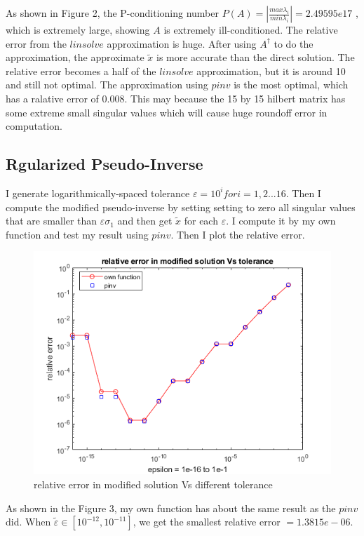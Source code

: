 \documentclass[a4paper]{article}
\begin{document}
As shown in Figure 2, the P-conditioning number $P(A)=|\frac{max\lambda_i}{min\lambda_i}|=2.49595e17$ , which is extremely large, showing $A$ is extremely ill-conditioned. The relative error from the $linsolve$ approximation is huge. After using $A^{\dagger}$ to do the approximation, the approximate $\tilde{x}$ is more accurate than the direct solution. The relative error becomes a half of the $linsolve$ approximation, but it is around 10 and still not optimal. The approximation using $pinv$ is the most optimal, which has a ralative error of 0.008. This may because the 15 by 15 hilbert matrix has some extreme small singular values which will cause huge roundoff error in computation.

\subsection{Rgularized Pseudo-Inverse}
I generate logarithmically-spaced tolerance $\varepsilon = 10^{i} for i = 1,2...16$. Then I compute the modified pseudo-inverse by setting setting to zero all singular values that are smaller than $\varepsilon\sigma_{1}$ and then get $\tilde{x}$ for each $\varepsilon$. I compute it by my own function and test my result using $pinv$. Then I plot the relative error.

\begin{figure}[H] 
\centering 
\includegraphics[width=1.0\textwidth]{1.2-1.png}
\caption{relative error in modified solution Vs different tolerance} 
\label{Fig.1.2-1} 
\end{figure}

As shown in the Figure 3, my own function has about the same result as the $pinv$ did. When $\tilde{\varepsilon} \in [10^{-12},10^{-11}]$, we get the smallest relative error $= 1.3815e-06$. 
\end{document}
